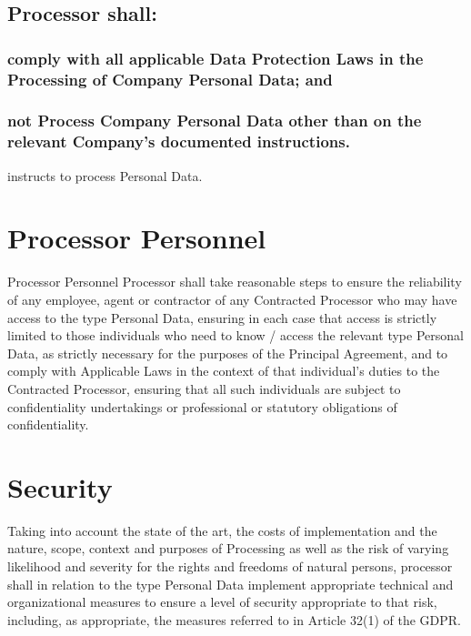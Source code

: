 \documentclass[a4paper]{article}
\begin{document}
\subsection{Processor shall:}

\subsubsection{comply with all applicable Data Protection Laws in the Processing of Company Personal Data; and}

\subsubsection{not Process Company Personal Data other than on the relevant Company's documented instructions.}

 instructs  to process  Personal Data.

\section{Processor Personnel}

Processor Personnel Processor shall take reasonable steps to ensure the reliability of any employee, agent or contractor of any Contracted Processor who may have access to the \gls{type} Personal Data, ensuring in each case that access is strictly limited to those individuals who need to know / access the relevant \gls{type} Personal Data, as strictly necessary for the purposes of the Principal Agreement, and to comply with Applicable Laws in the context of that individual's duties to the Contracted Processor, ensuring that all such individuals are subject to confidentiality undertakings or professional or statutory obligations of confidentiality.

\section{Security}

Taking into account the state of the art, the costs of implementation and the nature, scope, context and purposes of Processing as well as the risk of varying likelihood and severity for the rights and freedoms of natural persons, \gls{processor} shall in relation to the \gls{type} Personal Data implement appropriate technical and organizational measures to ensure a level of security appropriate to that risk, including, as appropriate, the measures referred to in Article 32(1) of the GDPR.
\end{document}
